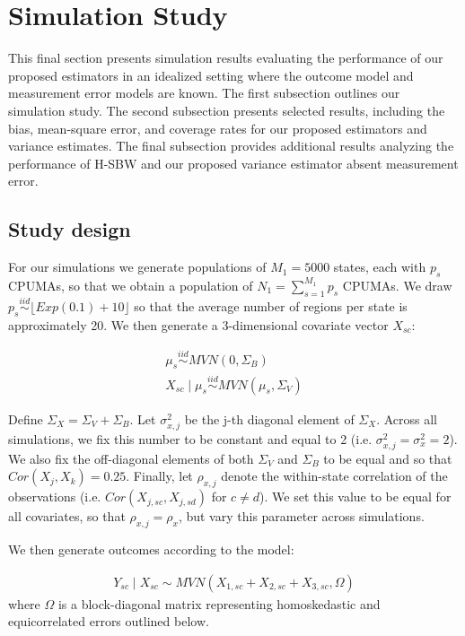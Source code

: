 \section{Simulation Study}\label{app:simstudy}

This final section presents simulation results evaluating the performance of our proposed estimators in an idealized setting where the outcome model and measurement error models are known. The first subsection outlines our simulation study. The second subsection presents selected results, including the bias, mean-square error, and coverage rates for our proposed estimators and variance estimates. The final subsection provides additional results analyzing the performance of H-SBW and our proposed variance estimator absent measurement error.

\subsection{Study design}

For our simulations we generate populations of $M_1 = 5000$ states, each with $p_s$ CPUMAs, so that we obtain a population of $N_1 = \sum_{s=1}^{M_1} p_s$ CPUMAs. We draw $p_s \stackrel{iid}\sim \lfloor Exp(0.1) + 10\rfloor$ so that the average number of regions per state is approximately 20. We then generate a 3-dimensional covariate vector $X_{sc}$:

\begin{align}\label{eqn:pheccovariates}
\mu_s \stackrel{iid}\sim MVN(0, \Sigma_B) \\
X_{sc} \mid \mu_s \stackrel{iid}\sim MVN(\mu_s, \Sigma_V) 
\end{align}

Define $\Sigma_X = \Sigma_V + \Sigma_B$. Let $\sigma^2_{x, j}$ be the j-th diagonal element of $\Sigma_X$. Across all simulations, we fix this number to be constant and equal to 2 (i.e. $\sigma^2_{x, j} = \sigma^2_x = 2$). We also fix the off-diagonal elements of both $\Sigma_V$ and $\Sigma_B$ to be equal and so that $Cor(X_j, X_k) = 0.25$. Finally, let $\rho_{x, j}$ denote the within-state correlation of the observations (i.e. $Cor(X_{j, sc}, X_{j, sd})$ for $c \ne d$). We set this value to be equal for all covariates, so that $\rho_{x, j} = \rho_x$, but vary this parameter across simulations.

We then generate outcomes according to the model:

\begin{align*}
Y_{sc} \mid X_{sc} \sim MVN(X_{1, sc} + X_{2, sc} + X_{3, sc}, \Omega)
\end{align*}
%
where $\Omega$ is a block-diagonal matrix representing homoskedastic and equicorrelated errors outlined below.

